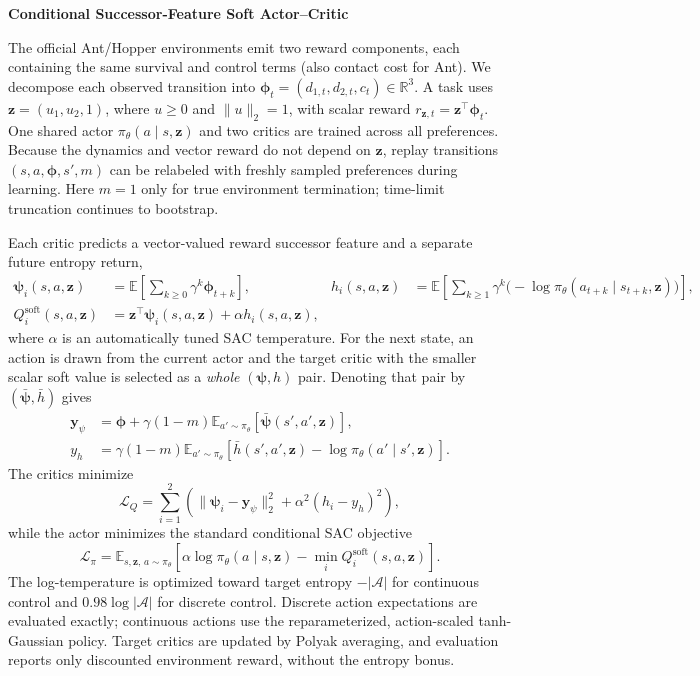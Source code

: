 \documentclass[10pt]{article}
\begin{document}
\begin{center}
    {\large\bf Conditional Successor-Feature Soft Actor--Critic}
\end{center}

The official Ant/Hopper environments emit two reward components, each containing
the same survival and control terms (also contact cost for Ant). We decompose
each observed transition into $\boldsymbol\phi_t=(d_{1,t},d_{2,t},c_t)\in\mathbb{R}^3$.
A task uses $\mathbf z=(u_1,u_2,1)$, where $u\geq0$ and $\|u\|_2=1$, with
scalar reward $r_{\mathbf z,t}=\mathbf z^\top\boldsymbol\phi_t$.  One shared
actor $\pi_\theta(a\mid s,\mathbf z)$ and two critics are trained across all
preferences.  Because the dynamics and vector reward do not depend on
$\mathbf z$, replay transitions $(s,a,\boldsymbol\phi,s',m)$ can be relabeled
with freshly sampled preferences during learning.  Here $m=1$ only for true
environment termination; time-limit truncation continues to bootstrap.

Each critic predicts a vector-valued reward successor feature and a separate
future entropy return,
\begin{align*}
 \boldsymbol\psi_i(s,a,\mathbf z)
 &=\mathbb E\!\left[\sum_{k\geq0}\gamma^k
        \boldsymbol\phi_{t+k}\right], &
 h_i(s,a,\mathbf z)
 &=\mathbb E\!\left[\sum_{k\geq1}\gamma^k
        \bigl(-\log\pi_\theta(a_{t+k}\mid s_{t+k},\mathbf z)\bigr)\right],\\[-2pt]
 Q_i^{\mathrm{soft}}(s,a,\mathbf z)
 &=\mathbf z^\top\boldsymbol\psi_i(s,a,\mathbf z)+\alpha h_i(s,a,\mathbf z),
\end{align*}
where $\alpha$ is an automatically tuned SAC temperature.  For the next
state, an action is drawn from the current actor and the target critic with the
smaller scalar soft value is selected as a \emph{whole} $(\boldsymbol\psi,h)$
pair.  Denoting that pair by $(\bar{\boldsymbol\psi},\bar h)$ gives
\begin{align*}
 \mathbf y_\psi &= \boldsymbol\phi+\gamma(1-m)
       \mathbb E_{a'\sim\pi_\theta}
       [\bar{\boldsymbol\psi}(s',a',\mathbf z)],\\
 y_h &= \gamma(1-m)\mathbb E_{a'\sim\pi_\theta}
       [\bar h(s',a',\mathbf z)-\log\pi_\theta(a'\mid s',\mathbf z)].
\end{align*}
The critics minimize
\[
 \mathcal L_Q=\sum_{i=1}^2\left(
 \|\boldsymbol\psi_i-\mathbf y_\psi\|_2^2
 +\alpha^2(h_i-y_h)^2\right),
\]
while the actor minimizes the standard conditional SAC objective
\[
 \mathcal L_\pi=
 \mathbb E_{s,\mathbf z,\,a\sim\pi_\theta}
 \left[\alpha\log\pi_\theta(a\mid s,\mathbf z)
 -\min_i Q_i^{\mathrm{soft}}(s,a,\mathbf z)\right].
\]
The log-temperature is optimized toward target entropy $-|\mathcal A|$ for
continuous control and $0.98\log|\mathcal A|$ for discrete control.  Discrete
action expectations are evaluated exactly; continuous actions use the
reparameterized, action-scaled tanh-Gaussian policy.  Target critics are updated
by Polyak averaging, and evaluation reports only discounted environment reward,
without the entropy bonus.
\end{document}
